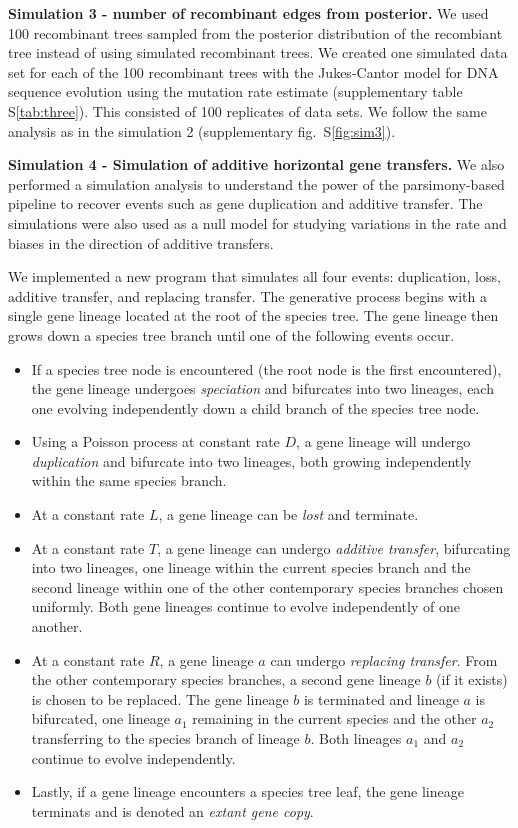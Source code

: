\documentclass[12pt]{article}
\begin{document}
\textbf{Simulation 3 - number of recombinant edges from posterior.}
We used 100 recombinant trees sampled from the posterior distribution
of the recombiant tree instead of using simulated recombinant trees.
We created one simulated data set for each of the 100 recombinant trees with
the Jukes-Cantor model for DNA sequence evolution 
using the mutation rate estimate (supplementary table S\ref{tab:three}).
This consisted of 100 replicates of data sets.  
We follow the same analysis as in the simulation 2 
(supplementary fig.\ S\ref{fig:sim3}).



\textbf{Simulation 4 - Simulation of additive horizontal gene transfers.}
We also performed a simulation analysis to understand the power of 
the parsimony-based pipeline to recover events such as gene duplication 
and additive transfer.  The simulations were also used as a null model
for studying variations in the rate and biases in the direction of
additive transfers.

We implemented a new program that simulates all four events:
duplication, loss, additive transfer, and replacing transfer.  The
generative process begins with a single gene lineage located at the
root of the species tree.  The gene lineage then grows down a species
tree branch until one of the following events occur.  

\begin{itemize}
\item If a species tree node is encountered (the root node is the
  first encountered), the gene lineage undergoes {\em speciation} and
  bifurcates into two lineages, each one evolving independently down a
  child branch of the species tree node.  
\item Using a Poisson process at constant rate $D$, a gene lineage
  will undergo {\em duplication} and bifurcate into two lineages, both
  growing independently within the same species branch.  
\item At a constant rate $L$, a gene lineage can be {\em lost} and
  terminate.  
\item At a constant rate $T$, a gene lineage can undergo {\em additive
  transfer}, bifurcating into two lineages, one lineage within
  the current species branch and the second lineage within one
  of the other contemporary species branches chosen uniformly.  Both
  gene lineages continue to evolve independently of one another.  
\item At a constant rate $R$, a gene lineage $a$ can undergo {\em replacing
  transfer}.  From the other contemporary species branches, a second
  gene lineage $b$ (if it exists) is chosen to be replaced.  The gene
  lineage $b$ is terminated and lineage $a$ is bifurcated, one lineage $a_1$
  remaining in the current species and the other $a_2$ transferring to the
  species branch of lineage $b$.  Both lineages $a_1$ and $a_2$ continue
  to evolve independently.
\item Lastly, if a gene lineage encounters a species tree leaf, the
  gene lineage terminats and is denoted an {\em extant gene copy}.
\end{itemize}
\end{document}
